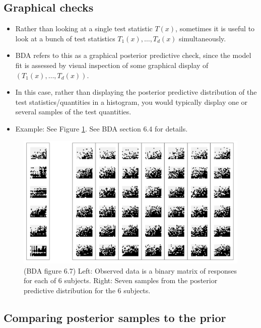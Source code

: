 \documentclass[12pt]{article}
\begin{document}
\subsection{Graphical checks}
\begin{itemize}
\item Rather than looking at a single test statistic $T(x)$, sometimes it is useful to look at a bunch of test statistics $T_1(x),\ldots,T_d(x)$ simultaneously.
\item BDA refers to this as a graphical posterior predictive check, since the model fit is assessed by visual inspection of some graphical display of $(T_1(x),\ldots,T_d(x))$.
\item In this case, rather than displaying the posterior predictive distribution of the test statistics/quantities in a histogram, you would typically display one or several samples of the test quantities.
\item Example: See Figure \ref{figure:graphical}. See BDA section 6.4 for details.
\end{itemize}

\begin{figure}
\begin{center}
\includegraphics[width=1\textwidth]{graphical.png}
\end{center}
\caption{(BDA figure 6.7) Left: Observed data is a binary matrix of responses for each of 6 subjects. Right: Seven samples from the posterior predictive distribution for the 6 subjects.}
\label{figure:graphical}
\end{figure}



\subsection{Comparing posterior samples to the prior}
\end{document}
